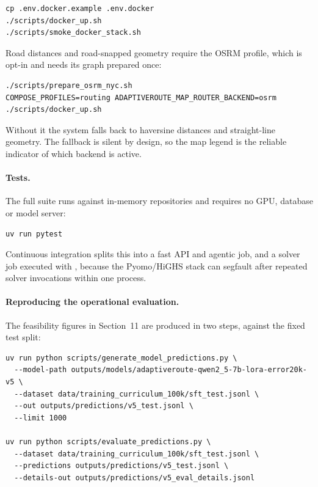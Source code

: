 \documentclass[11pt,a4paper]{article}
\begin{document}
\begin{verbatim}
cp .env.docker.example .env.docker
./scripts/docker_up.sh
./scripts/smoke_docker_stack.sh
\end{verbatim}

Road distances and road-snapped geometry require the OSRM profile, which is opt-in and needs its
graph prepared once:

\begin{verbatim}
./scripts/prepare_osrm_nyc.sh
COMPOSE_PROFILES=routing ADAPTIVEROUTE_MAP_ROUTER_BACKEND=osrm ./scripts/docker_up.sh
\end{verbatim}

Without it the system falls back to haversine distances and straight-line geometry. The fallback is
silent by design, so the map legend is the reliable indicator of which backend is active.

\paragraph{Tests.}
The full suite runs against in-memory repositories and requires no GPU, database or model server:

\begin{verbatim}
uv run pytest
\end{verbatim}

Continuous integration splits this into a fast API and agentic job, and a solver job executed with
, because the Pyomo/HiGHS stack can segfault after repeated solver invocations
within one process.

\paragraph{Reproducing the operational evaluation.}
The feasibility figures in Section~11 are produced in two steps, against the fixed test split:

\begin{verbatim}
uv run python scripts/generate_model_predictions.py \
  --model-path outputs/models/adaptiveroute-qwen2_5-7b-lora-error20k-v5 \
  --dataset data/training_curriculum_100k/sft_test.jsonl \
  --out outputs/predictions/v5_test.jsonl \
  --limit 1000

uv run python scripts/evaluate_predictions.py \
  --dataset data/training_curriculum_100k/sft_test.jsonl \
  --predictions outputs/predictions/v5_test.jsonl \
  --details-out outputs/predictions/v5_eval_details.jsonl
\end{verbatim}
\end{document}

